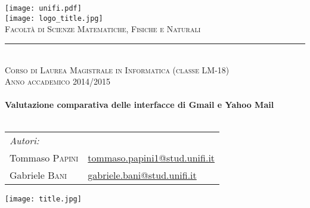 \begin{titlepage}
	\begin{center}
		
		\texttt{[image: unifi.pdf]}\\[0.5cm]
		
		\texttt{[image: logo\_title.jpg]}\\
		\textsc{Facoltà di Scienze Matematiche, Fisiche e Naturali}\\
		\rule{0.8\linewidth}{0.2mm}\\
		\textsc{\footnotesize Corso di Laurea Magistrale in Informatica (classe LM-18)}\\[1.8cm]
		
		\textsc{Anno accademico 2014/2015}\\
		\HRule \\[0.4cm]
		{\huge \bfseries Valutazione comparativa delle interfacce  di Gmail e Yahoo Mail}\\[0.4cm]
		\HRule \\[0.6cm]
		
		\begin{flushleft}
			\begin{tabular}{ll}
				\emph{Autori:} &\\
				Tommaso \textsc{Papini} & \href{mailto:tommaso.papini1@stud.unifi.it}{tommaso.papini1@stud.unifi.it}\\
				Gabriele \textsc{Bani} & \href{mailto:gabriele.bani@stud.unifi.it}{gabriele.bani@stud.unifi.it}\\[0.6cm]
			\end{tabular}
		\end{flushleft}
		
		\texttt{[image: title.jpg]}
		
	\end{center}
\end{titlepage}
